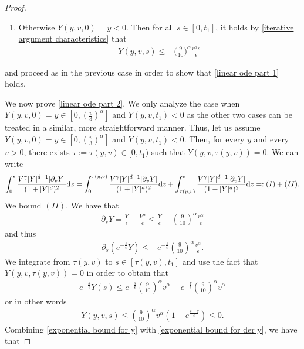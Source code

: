 \documentclass[11pt]{article}
\numberwithin{equation}{section}
\newcommand{\der}{\textup{d}}
\begin{document}
\begin{proof}
\begin{enumerate}\item[iii)]Otherwise $Y(y,v,0)=y<0$. Then for all $s\in[0,t_{1}]$, it holds by  \eqref{iterative argument characteristics} that
  \begin{align*}
Y(y,v,s)\leq -\Big(\frac{9}{10}\Big)^{\alpha}\frac{v^{\alpha}s}{\epsilon}
  \end{align*}\end{enumerate}and proceed as in the previous case in order to show that \eqref{linear ode part 1} holds.


We now prove \eqref{linear ode part 2}. We only analyze the case when $Y(y,v,0)=y\in[0,(\frac{v}{3})^{\alpha}]$ and $Y(y,v,t_{1})<0$ as the other two cases can be treated in a similar, more straightforward manner.
Thus, let us assume $Y(y,v,0)=y\in[0,(\frac{v}{3})^{\alpha}]$ and $Y(y,v,t_{1})<0$. Then, for every $y$ and every $v>0$, there exists $\tau:=\tau(y,v)\in[0,t_{1})$ such that $Y(y,v,\tau(y,v))=0$. We can write 
\begin{align*}
     \int_{0}^{s}\frac{V^{\gamma}|Y|^{d-1}|\partial_{v}Y|}{(1+|Y|^{d})^{2}}\der z = \int_{0}^{\tau(y,v)}\frac{V^{\gamma}|Y|^{d-1}|\partial_{v}Y|}{(1+|Y|^{d})^{2}}\der z + \int_{\tau(y,v)}^{s}\frac{V^{\gamma}|Y|^{d-1}|\partial_{v}Y|}{(1+|Y|^{d})^{2}}\der z =:(I)+(II).
\end{align*}
We bound $(II)$.
We have that
\begin{align*}
    \partial_{s}Y=\frac{Y}{\epsilon}-\frac{V^{\alpha}}{\epsilon}\leq \frac{Y}{\epsilon}-(\frac{9}{10})^{\alpha}\frac{ v^{\alpha}}{\epsilon}
\end{align*}
and thus
\begin{align*}
    \partial_{s}(e^{-\frac{s}{\epsilon}}Y)\leq -e^{-\frac{s}{\epsilon}}(\frac{9}{10})^{\alpha}\frac{v^{\alpha}}{\epsilon}.
\end{align*}
We integrate from $\tau(y,v)$ to $s\in[\tau(y,v),t_{1}]$ and use the fact that $Y(y,v,\tau(y,v))=0$ in order to obtain that
\begin{align*}
   e^{-\frac{s}{\epsilon}}Y(s)\leq e^{-\frac{s}{\epsilon}}(\frac{9}{10})^{\alpha}v^{\alpha}-e^{-\frac{\tau}{\epsilon}}(\frac{9}{10})^{\alpha}v^{\alpha}
\end{align*}
or in other words
\begin{align}\label{exponential bound for y}
    Y(y,v,s)\leq (\frac{9}{10})^{\alpha}v^{\alpha}(1-e^{\frac{s-\tau}{\epsilon}})\leq 0.
\end{align}
Combining \eqref{exponential bound for y} with \eqref{exponential bound for der y}, we have that

\end{proof}
\end{document}
